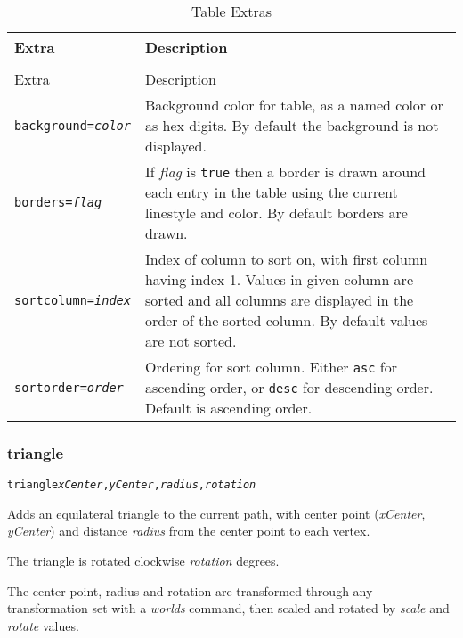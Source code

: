 \begin{longtable}{|l|p{7cm}|}
\hline
\label{tableextras}
Extra & Description \\
\hline
\hline
\endfirsthead
\hline
\caption{Table Extras} \\
\endfoot

\hline
Extra & Description \\
\hline
\hline
\endhead

\texttt{background=\textit{color}} &

Background color for table, as a named color or as hex digits.
By default the background is not displayed. \\

\texttt{borders=\textit{flag}} &

If \textit{flag} is \texttt{true} then a border is drawn around
each entry in the table using the current linestyle and color.
By default borders are drawn. \\

\texttt{sortcolumn=\textit{index}} &

Index of column to sort on, with first column having index 1.
Values in given column are sorted and all columns are displayed
in the order of the sorted column.
By default values are not sorted. \\

\texttt{sortorder=\textit{order}} &

Ordering for sort column.  Either \texttt{asc} for ascending
order, or \texttt{desc} for descending order.  Default is ascending order. \\

\hline
\end{longtable}


\subsubsection{triangle}

\begin{alltt}
triangle \textit{xCenter}, \textit{yCenter}, \textit{radius}, \textit{rotation}
\end{alltt}

Adds an equilateral triangle to the current path, with center
point (\textit{xCenter}, \textit{yCenter}) and distance
\textit{radius}
from the center point to each vertex.

The triangle is rotated clockwise \textit{rotation} degrees.

The center point, radius and rotation are transformed through any
transformation set with a \textit{worlds} command,
then scaled and rotated by \textit{scale}
and \textit{rotate} values.

